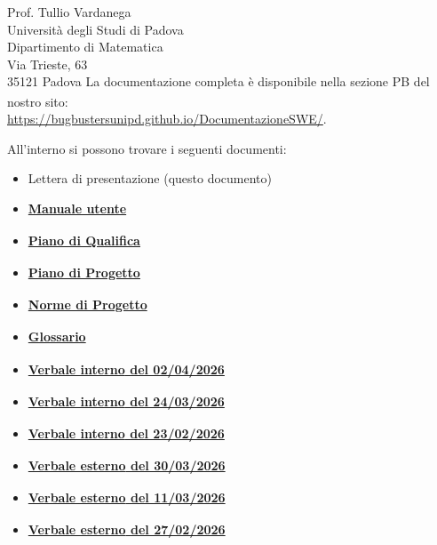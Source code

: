 \documentclass[a4paper,11pt]{letter}
\begin{document}
\begin{letter}{Prof. Tullio Vardanega\\Universit\`a degli Studi di Padova\\Dipartimento di Matematica\\Via Trieste, 63\\35121 Padova}
La documentazione completa è disponibile nella sezione PB\textsubscript{} del nostro sito:\\ 
\url{https://bugbustersunipd.github.io/DocumentazioneSWE/}.

All'interno si possono trovare i seguenti documenti:
\begin{itemize}
    \item Lettera di presentazione (questo documento)
    \item \href{https://bugbustersunipd.github.io/DocumentazioneSWE/PB/MANUALE%20UTENTE/Manuale%20utente.pdf}{\textbf{Manuale utente\textsubscript{\scalebox{0.6}{\textbf{G}}}}}
    \item \href{https://bugbustersunipd.github.io/DocumentazioneSWE/PB/PIANO%20DI%20QUALIFICA/Piano%20di%20Qualifica.pdf}{\textbf{Piano di Qualifica\textsubscript{\scalebox{0.6}{\textbf{G}}}}}
    \item \href{https://bugbustersunipd.github.io/DocumentazioneSWE/PB/PIANO%20DI%20PROGETTO/Piano%20di%20progetto.pdf}{\textbf{Piano di Progetto\textsubscript{\scalebox{0.6}{\textbf{G}}}}}
    \item \href{https://bugbustersunipd.github.io/DocumentazioneSWE/PB/NORME%20DI%20PROGETTO/Norme%20di%20Progetto.pdf}{\textbf{Norme di Progetto\textsubscript{\scalebox{0.6}{\textbf{G}}}}}
    \item \href{https://bugbustersunipd.github.io/DocumentazioneSWE/PB/GLOSSARIO/Glossario.pdf}{\textbf{Glossario\textsubscript{}}}
    \item \href{https://bugbustersunipd.github.io/DocumentazioneSWE/PB/VERBALI/INTERNI/VI_2026-04-02/VI_2026-04-02.pdf}{\textbf{Verbale interno\textsubscript{} del 02/04/2026}}
    \item \href{https://bugbustersunipd.github.io/DocumentazioneSWE/PB/VERBALI/INTERNI/VI_2026-03-24/VI_2026-03-24.pdf}{\textbf{Verbale interno\textsubscript{} del 24/03/2026}}
    \item \href{https://bugbustersunipd.github.io/DocumentazioneSWE/PB/VERBALI/INTERNI/VI_2026-02-23/VI_2026-02-23.pdf}{\textbf{Verbale interno\textsubscript{} del 23/02/2026}}
    \item \href{https://bugbustersunipd.github.io/DocumentazioneSWE/PB/VERBALI/ESTERNI/VE_2026-03-30/VE_2026-03-30.pdf}{\textbf{Verbale esterno\textsubscript{} del 30/03/2026}}
    \item \href{https://bugbustersunipd.github.io/DocumentazioneSWE/PB/VERBALI/ESTERNI/VE_2026-03-11/VE_2026-03-11.pdf}{\textbf{Verbale esterno\textsubscript{} del 11/03/2026}}
    \item \href{https://bugbustersunipd.github.io/DocumentazioneSWE/PB/VERBALI/ESTERNI/VE_2026-02-27/VE_2026-02-27.pdf}{\textbf{Verbale esterno\textsubscript{} del 27/02/2026}}
\end{itemize}


\end{letter}
\end{document}
